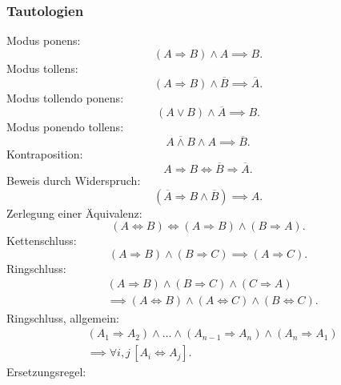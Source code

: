 \subsubsection{Tautologien}
Modus ponens:
\begin{equation}\label{eq:modus-ponens}
(A\Rightarrow B)\land A\implies B.
\end{equation}
Modus tollens:
\begin{equation}
(A\Rightarrow B)\land\overline B\implies\overline A.
\end{equation}
Modus tollendo ponens:
\begin{equation}
(A\lor B)\land\overline A \implies B.
\end{equation}
Modus ponendo tollens:
\begin{equation}
\overline{A\land B}\land A\implies\overline B.
\end{equation}
Kontraposition:
\begin{equation}
A\Rightarrow B \iff \overline B\Rightarrow \overline A.
\end{equation}
Beweis durch Widerspruch:
\begin{equation}
(\overline A\Rightarrow B\land\overline B)\implies A.
\end{equation}
Zerlegung einer Äquivalenz:
\begin{equation}
(A\Leftrightarrow B) \iff (A\Rightarrow B)\land(B\Rightarrow A).
\end{equation}
Kettenschluss:
\begin{equation}
(A\Rightarrow B)\land(B\Rightarrow C)\implies (A\Rightarrow C).
\end{equation}
Ringschluss:
\begin{equation}
\begin{split}
&(A\Rightarrow B)\land (B\Rightarrow C)\land(C\Rightarrow A)\\
&\implies (A\Leftrightarrow B)\land(A\Leftrightarrow C)\land(B\Leftrightarrow C).
\end{split}
\end{equation}
Ringschluss, allgemein:
\begin{equation}
\begin{split}
& (A_1{\Rightarrow }A_2)\land\ldots\land(A_{n-1}{\Rightarrow}A_n)
\land(A_n{\Rightarrow}A_1)\\
& \implies \forall i,j\,[A_i\Leftrightarrow A_j].
\end{split}
\end{equation}
Ersetzungsregel:

